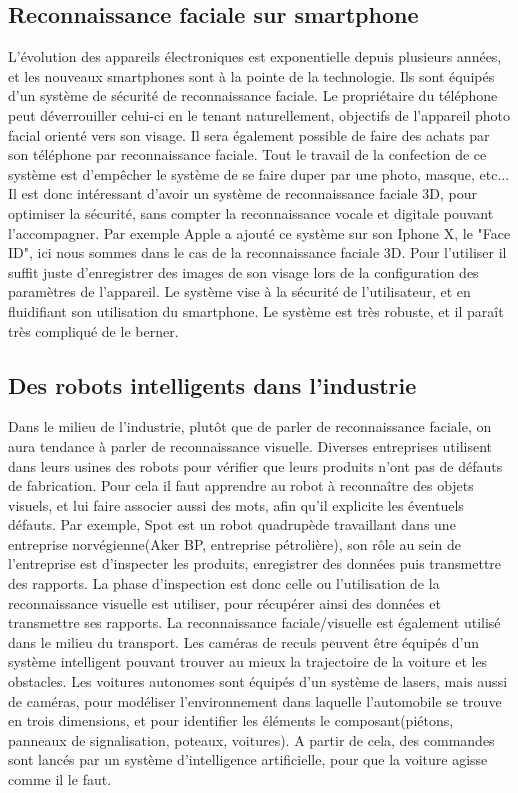\documentclass[12pt,french]{article}
\theoremstyle{plain}
\theoremstyle{definition}
\begin{document}
\subsection{Reconnaissance faciale sur smartphone}
L'évolution des appareils électroniques est exponentielle depuis plusieurs années, et les nouveaux smartphones sont à la pointe de la technologie. Ils sont équipés d'un système de sécurité de reconnaissance faciale. Le propriétaire du téléphone peut déverrouiller celui-ci en le tenant naturellement, objectifs de l'appareil photo facial orienté vers son visage. Il sera également possible de faire des achats par son téléphone par reconnaissance faciale. Tout le travail de la confection de ce système est d'empêcher le système de se faire duper par une photo, masque, etc... Il est donc intéressant d'avoir un système de reconnaissance faciale 3D, pour optimiser la sécurité, sans compter la reconnaissance vocale et digitale pouvant l'accompagner. 
Par exemple Apple a ajouté ce système sur son Iphone X, le "Face ID", ici nous sommes dans le cas de la reconnaissance faciale 3D. Pour l'utiliser il suffit juste d'enregistrer des images de son visage lors de la configuration des paramètres de l'appareil. Le système vise à la sécurité de l'utilisateur, et en fluidifiant son utilisation du smartphone. Le système est très robuste, et il paraît très compliqué de le berner.
\subsection{Des robots intelligents dans l'industrie}
Dans le milieu de l'industrie, plutôt que de parler de reconnaissance faciale, on aura tendance à parler de reconnaissance visuelle. Diverses entreprises utilisent dans leurs usines des robots pour vérifier que leurs produits n'ont pas de défauts de fabrication. Pour cela il faut apprendre au robot à reconnaître des objets visuels, et lui faire associer aussi des mots, afin qu'il explicite les éventuels défauts. Par exemple, Spot est un robot quadrupède travaillant dans une entreprise norvégienne(Aker BP, entreprise pétrolière), son rôle au sein de l'entreprise est d'inspecter les produits, enregistrer des données puis transmettre des rapports. La phase d'inspection est donc celle ou l'utilisation de la reconnaissance visuelle est utiliser, pour récupérer ainsi des données et transmettre ses rapports.
La reconnaissance faciale/visuelle est également utilisé dans le milieu du transport. Les caméras de reculs peuvent être équipés d'un système intelligent pouvant trouver au mieux la trajectoire de la voiture et les obstacles. 
Les voitures autonomes sont équipés d'un système de lasers, mais aussi de caméras, pour modéliser l'environnement dans laquelle l'automobile se trouve en trois dimensions, et pour identifier les éléments le composant(piétons, panneaux de signalisation, poteaux, voitures). A partir de cela, des commandes sont lancés par un système d'intelligence artificielle, pour que la voiture agisse comme il le faut.
\end{document}
